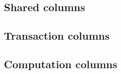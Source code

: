 \subsection{Shared columns}                     
\subsection{Transaction columns}                
\subsection{Computation columns}                
